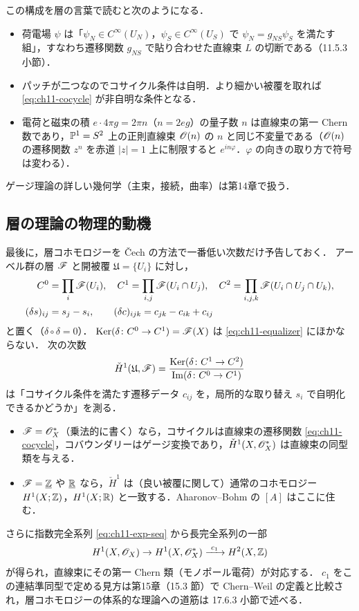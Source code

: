 この構成を層の言葉で読むと次のようになる．
\begin{itemize}
  \item 荷電場 $\psi$ は「$\psi_N\in C^\infty(U_N)$，$\psi_S\in C^\infty(U_S)$ で $\psi_N=g_{NS}\psi_S$ を満たす組」，すなわち遷移関数 $g_{NS}$ で貼り合わせた直線束 $L$ の切断である（11.5.3 小節）．
  \item パッチが二つなのでコサイクル条件は自明．より細かい被覆を取れば \eqref{eq:ch11-cocycle} が非自明な条件となる．
  \item 電荷と磁束の積 $e\cdot4\pi g = 2\pi n$（$n=2eg$）の量子数 $n$ は直線束の第一 Chern 数であり，$\mathbb{P}^1=S^2$ 上の正則直線束 $\mathscr{O}(n)$ の $n$ と同じ不変量である（$\mathscr{O}(n)$ の遷移関数 $z^{n}$ を赤道 $|z|=1$ 上に制限すると $e^{in\varphi}$．$\varphi$ の向きの取り方で符号は変わる）．
\end{itemize}
ゲージ理論の詳しい幾何学（主束，接続，曲率）は第14章で扱う．

\subsection{層の理論の物理的動機}

最後に，層コホモロジーを Čech の方法で一番低い次数だけ予告しておく．
アーベル群の層 $\mathscr{F}$ と開被覆 $\mathfrak{U}=\{U_i\}$ に対し，
\begin{align*}
  C^0 &= \prod_i\mathscr{F}(U_i),\quad C^1=\prod_{i,j}\mathscr{F}(U_i\cap U_j),\quad C^2=\prod_{i,j,k}\mathscr{F}(U_i\cap U_j\cap U_k),\\
  (\delta s)_{ij}&=s_j-s_i,\qquad (\delta c)_{ijk}=c_{jk}-c_{ik}+c_{ij}
\end{align*}
と置く（$\delta\circ\delta=0$）．
$\operatorname{Ker}(\delta\colon C^0\to C^1)=\mathscr{F}(X)$ は \eqref{eq:ch11-equalizer} にほかならない．
次の次数
\[
  \check{H}^1(\mathfrak{U},\mathscr{F}) = \frac{\operatorname{Ker}(\delta\colon C^1\to C^2)}{\operatorname{Im}(\delta\colon C^0\to C^1)}
\]
は「コサイクル条件を満たす遷移データ $c_{ij}$ を，局所的な取り替え $s_i$ で自明化できるかどうか」を測る．
\begin{itemize}
  \item $\mathscr{F}=\mathscr{O}_X^*$（乗法的に書く）なら，コサイクルは直線束の遷移関数 \eqref{eq:ch11-cocycle}，コバウンダリーはゲージ変換であり，$\check{H}^1(X,\mathscr{O}_X^*)$ は直線束の同型類を与える．
  \item $\mathscr{F}=\underline{\mathbb{Z}}$ や $\underline{\mathbb{R}}$ なら，$\check{H}^1$ は（良い被覆に関して）通常のコホモロジー $H^1(X;\mathbb{Z})$，$H^1(X;\mathbb{R})$ と一致する．Aharonov--Bohm の $[A]$ はここに住む．
\end{itemize}
さらに指数完全系列 \eqref{eq:ch11-exp-seq} から長完全系列の一部
\[
  H^1(X,\mathscr{O}_X)\to H^1(X,\mathscr{O}_X^*)\xrightarrow{\ c_1\ }H^2(X,\mathbb{Z})
\]
が得られ，直線束にその第一 Chern 類（モノポール電荷）が対応する．
$c_1$ をこの連結準同型で定める見方は第15章（15.3 節）で Chern--Weil の定義と比較され，層コホモロジーの体系的な理論への道筋は 17.6.3 小節で述べる．

